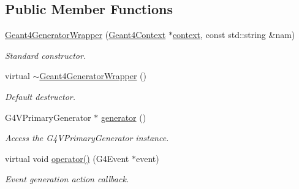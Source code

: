 \subsection*{Public Member Functions}
\begin{DoxyCompactItemize}
\item 
\hyperlink{class_d_d4hep_1_1_simulation_1_1_geant4_generator_wrapper_add52b72c8a305745d95bddd0a6d0c5f4}{Geant4\+Generator\+Wrapper} (\hyperlink{class_d_d4hep_1_1_simulation_1_1_geant4_context}{Geant4\+Context} $\ast$\hyperlink{class_d_d4hep_1_1_simulation_1_1_geant4_action_aa9d87f0ec2a72b7fc2591b18f98d75cf}{context}, const std\+::string \&nam)
\begin{DoxyCompactList}\small\item\em Standard constructor. \end{DoxyCompactList}\item 
virtual \hyperlink{class_d_d4hep_1_1_simulation_1_1_geant4_generator_wrapper_a6b3f7695a18e97d4aed0f414368ff84a}{$\sim$\+Geant4\+Generator\+Wrapper} ()
\begin{DoxyCompactList}\small\item\em Default destructor. \end{DoxyCompactList}\item 
G4\+V\+Primary\+Generator $\ast$ \hyperlink{class_d_d4hep_1_1_simulation_1_1_geant4_generator_wrapper_a9185103e129d36edd74946ec77ef0b6b}{generator} ()
\begin{DoxyCompactList}\small\item\em Access the G4\+V\+Primary\+Generator instance. \end{DoxyCompactList}\item 
virtual void \hyperlink{class_d_d4hep_1_1_simulation_1_1_geant4_generator_wrapper_a073ee3177fe624c0caf2bb5068d9d865}{operator()} (G4\+Event $\ast$event)
\begin{DoxyCompactList}\small\item\em Event generation action callback. \end{DoxyCompactList}\end{DoxyCompactItemize}
